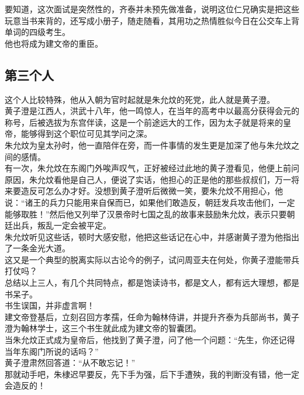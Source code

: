 \begin{multicols}{\theparacolNo}
要知道，这次面试是突然性的，齐泰并未预先做准备，说明这位仁兄确实是把这些玩意当书来背的，还写成小册子，随走随看，其用功之热情胜似今日在公交车上背单词的四级考生。\\

他也将成为建文帝的重臣。\\

\subsection{第三个人}
这个人比较特殊，他从入朝为官时起就是朱允炆的死党，此人就是黄子澄。\\

黄子澄是江西人，洪武十八年，他一鸣惊人，在当年的高考中以最高分获得会元的称号，后被选拔为东宫伴读，这是一个前途远大的工作，因为太子就是将来的皇帝，能够得到这个职位可见其学问之深。\\

朱允炆为皇太孙时，他一直陪伴在旁，而一件事情的发生更是加深了他与朱允炆之间的感情。\\

有一次，朱允炆在东阁门外唉声叹气，正好被经过此地的黄子澄看见，他便上前问原因，朱允炆看他是自己人，便说了实话，他担心的正是他的那些叔叔们，万一将来要造反可怎么办才好。没想到黄子澄听后微微一笑，要朱允炆不用担心，他说：“诸王的兵力只能用来自保而已，如果他们敢造反，朝廷发兵攻击他们，一定能够取胜！”然后他又列举了汉景帝时七国之乱的故事来鼓励朱允炆，表示只要朝廷出兵，叛乱一定会被平定。\\

朱允炆听见这些话，顿时大感安慰，他把这些话记在心中，并感谢黄子澄为他指出了一条金光大道。\\

这又是一个典型的脱离实际以古论今的例子，试问周亚夫在何处，你黄子澄能带兵打仗吗？\\

总结以上三人，有几个共同特点，都是饱读诗书，都是文人，都有远大理想，都是书呆子。\\

书生误国，并非虚言啊！\\

建文帝登基后，立刻召回方孝孺，任命为翰林侍讲，并提升齐泰为兵部尚书，黄子澄为翰林学士，这三个书生就此成为建文帝的智囊团。\\

当朱允炆正式成为皇帝后，他找到了黄子澄，问了他一个问题：“先生，你还记得当年东阁门所说的话吗？”\\

黄子澄肃然回答道：“从不敢忘记！”\\

那就动手吧，朱棣迟早要反，先下手为强，后下手遭殃，我的判断没有错，他一定会造反的！\\
\ifnum{}
	\end{multicols}
\fi
\newpage
